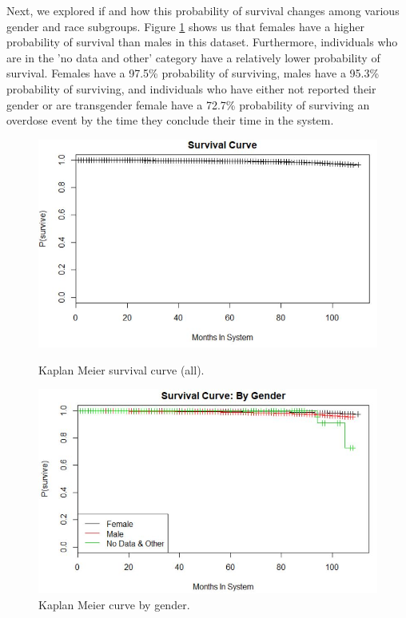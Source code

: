 \documentclass[twoside,10.5pt]{article}
\begin{document}
Next, we explored if and how this probability of survival changes among various gender and race subgroups. Figure \ref{fig:km_gender} shows us that females have a higher probability of survival than males in this dataset. Furthermore, individuals who are in the 'no data and other' category have a relatively lower probability of survival. Females have a 97.5\% probability of surviving, males have a 95.3\% probability of surviving, and individuals who have either not reported their gender or are transgender female have a 72.7\% probability of surviving an overdose event by the time they conclude their time in the system. \\

\begin{figure}[h!]
\centering
\begin{minipage}{.5\textwidth}
  \centering
  \includegraphics[width=1\linewidth]{images/kaplan_meier.JPG}
  \caption{Kaplan Meier survival curve (all).}
  \label{fig:km_original}
\end{minipage}%
\begin{minipage}{.5\textwidth}
  \centering
  \includegraphics[width=1\linewidth]{images/kaplan_meier_gender.JPG}
  \caption{Kaplan Meier curve by gender.}
  \label{fig:km_gender}
\end{minipage}
\end{figure}
\end{document}
